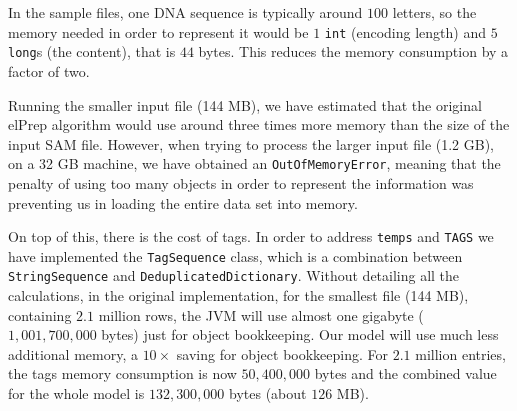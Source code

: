 \documentclass[a4paper,twoside]{article}
\begin{document}
In the sample files, one DNA sequence is typically around $100$ letters, so the memory needed in order to represent it would be $1$ {\texttt{int}} (encoding length) and $5$ {\texttt{long}}s (the content), that is $44$ bytes.
This reduces the memory consumption by a factor of two.



Running the smaller input file (144 MB), we have estimated that the original elPrep algorithm would use around three times more memory than the size of the input SAM file.
However, when trying to process the larger input file (1.2 GB), on a 32 GB machine, we have obtained an {\texttt{OutOfMemoryError}}, meaning that the penalty of using too many objects in order to represent the information was preventing us in loading the entire data set into memory.


On top of this, there is the cost of tags. 
In order to address {\texttt{temps}} and {\texttt{TAGS}} we have implemented the {\texttt{TagSequence}} class, which is a combination between {\texttt{StringSequence}} and {\texttt{DeduplicatedDictionary}}.
Without detailing all the calculations, in the original implementation, for the smallest file (144 MB), containing $2.1$ million rows, the JVM will use almost one gigabyte ($1,001,700,000$ bytes) just for object bookkeeping.
Our model will use much less additional memory, a $10\times$ saving for object bookkeeping.
For $2.1$ million entries, the tags memory consumption is now $50,400,000$ bytes and the combined value for the whole model is $132,300,000$ bytes (about $126$ MB).
\end{document}
